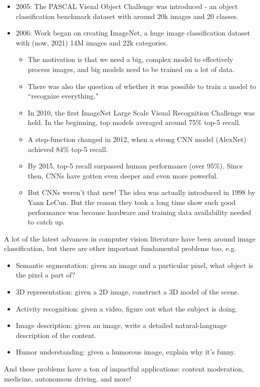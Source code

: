 \begin{itemize}
\item 2005: The PASCAL Visual Object Challenge was introduced - an object classification benchmark dataset with around 20k images and 20 classes.
\item 2006: Work began on creating ImageNet, a huge image classification dataset with (now, 2021) 14M images and 22k categories.
\begin{itemize}
\item The motivation is that we need a big, complex model to effectively process images, and big models need to be trained on a lot of data.
\item There was also the question of whether it was possible to train a model to ``recognize everything."
\item In 2010, the first ImageNet Large Scale Visual Recognition Challenge was held. In the beginning, top models averaged around 75\% top-5 recall.
\item A step-function changed in 2012, when a strong CNN model (AlexNet) achieved 84\% top-5 recall.
\item By 2015, top-5 recall surpassed human performance (over 95\%). Since then, CNNs have gotten even deeper and even more powerful.
\item But CNNs weren't that new! The idea was actually introduced in 1998 by Yann LeCun. But the reason they took a long time show such good performance was because hardware and training data availability needed to catch up.
\end{itemize}
\end{itemize}
A lot of the latest advances in computer vision literature have been around image classification, but there are other important fundamental problems too, e.g.
\begin{itemize}
\item Semantic segmentation: given an image and a particular pixel, what object is the pixel a part of?
\item 3D representation: given a 2D image, construct a 3D model of the scene.
\item Activity recognition: given a video, figure out what the subject is doing.
\item Image description: given an image, write a detailed natural-language description of the content.
\item Humor understanding: given a humorous image, explain why it's funny.
\end{itemize}
And these problems have a ton of impactful applications: content moderation, medicine, autonomous driving, and more!
